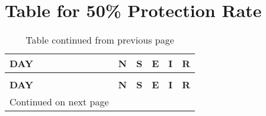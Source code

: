 \chapter{Table for 50\% Protection Rate}
\begin{longtable}{|l|l|l|l|l|l|}
	\caption{50\% Exposed Rate} \\
	
	\toprule
	\textbf{DAY} & \textbf{N} & \textbf{S} & \textbf{E }& \textbf{I} &\textbf{ R} \\
	\midrule
	\endfirsthead
	\caption*{Table continued from previous page} \\
	\toprule
	\textbf{DAY} & \textbf{N} & \textbf{S} & \textbf{E }& \textbf{I} &\textbf{ R} \\
	\midrule
	\endhead
	\midrule
	\multicolumn{1}{r}{\footnotesize Continued on next page}
	\endfoot
	\bottomrule
	\endlastfoot


\end{longtable}

